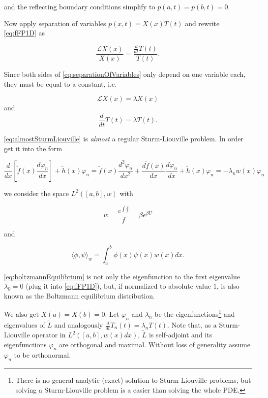and the reflecting boundary conditions simplify to $p(a,t)=p(b,t)=0$.

Now apply separation of variables $p(x,t)=X(x)T(t)$ and rewrite \eqref{eq:fFP1D} as

\begin{equation}\label{eq:separationOfVariables}
\frac{\mathcal{L}X(x)}{X(x)} = \frac{\frac{d}{dt}T(t)}{T(t)}.
\end{equation}

Since both sides of \eqref{eq:separationOfVariables} only depend on one variable each, they must be equal to a constant, i.e.

\begin{equation}\label{eq:almostSturmLiouville}
\mathcal{L}X(x) = \lambda X(x)
\end{equation}
and
\begin{equation*}
\frac{d}{dt}T(t)=\lambda T(t).
\end{equation*}

\eqref{eq:almostSturmLiouville} is \textit{almost} a regular Sturm-Liouville problem. In order get it into the form

\begin{equation*}
\frac{d}{dx}\left[\tilde{f}(x)\frac{d\varphi_n}{dx} \right] + \tilde{h}(x)\varphi_n = \tilde{f}(x)\frac{d^2 \varphi_n}{dx^2} + \frac{d \tilde{f}(x)}{dx}\frac{d \varphi_n}{dx}+ \tilde{h}(x)\varphi_n = -\lambda_n w(x)\varphi_n
\end{equation*}

we consider the space $L^2([a,b],w)$ with 

\begin{equation}\label{eq:boltzmannEquilibrium}
w = \frac{e^{\int \frac{g}{f}}}{f} = \beta e^{\beta U}
\end{equation}

and 

\begin{equation*}
\langle \phi, \psi \rangle_w = \int_a^b \phi(x)\psi(x)w(x)dx.
\end{equation*}

\eqref{eq:boltzmannEquilibrium} is not only the eigenfunction to the first eigenvalue $\lambda_0 = 0$ (plug it into \eqref{eq:fFP1D}), but, if normalized to absolute value $1$, is also known as the Boltzmann equilibrium distribution.

We also get $X(a)=X(b)=0$. Let $\varphi_n$ and $\lambda_n$ be the eigenfunctions\footnote{There is no general analytic (exact) solution to Sturm-Liouville problems, but solving a Sturm-Liouville problem is a easier than solving the whole PDE.} and eigenvalues of $\tilde{L}$ and analogously $\frac{d}{dt}T_n(t)=\lambda_n T(t)$. Note that, as a Sturm-Liouville operator in $L^2([a,b], w(x)dx)$, $\tilde{L}$ is self-adjoint and its eigenfunctions $\varphi_n$ are orthogonal and maximal. Without loss of generality assume $\varphi_n$ to be orthonormal.

